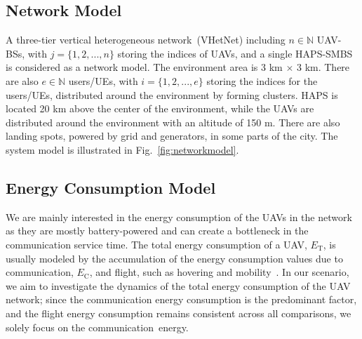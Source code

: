 \documentclass[conference, a4paper]{IEEEtran}
\begin{document}
\subsection{Network Model}
A three-tier vertical heterogeneous network~(VHetNet) including $n \in \mathbb{N}$ UAV-BSs, with $j=\{1, 2, ..., n\}$ storing the indices of UAVs, and a single HAPS-SMBS is considered as a network model. 
The environment area is 3 km $\times$ 3 km.
There are also $e \in \mathbb{N}$ users/UEs, with $i=\{1, 2, ..., e\}$ storing the indices for the users/UEs, distributed around the environment by forming clusters.
HAPS is located 20 km above the center of the environment, while the UAVs are distributed around the environment with an altitude of 150 m.
There are also landing spots, powered by grid and generators, in some parts of the city.
The system model is illustrated in Fig.~\ref{fig:networkmodel}.

\subsection{Energy Consumption Model}
We are mainly interested in the energy consumption of the UAVs in the network as they are mostly battery-powered and can create a bottleneck in the communication service time.
The total energy consumption of a UAV, $E_\text{T}$, is usually modeled by the accumulation of the energy consumption values due to communication, $E_\text{C}$, and flight, such as hovering and mobility~\cite{UAV_energy}.
In our scenario, we aim to investigate the dynamics of the total energy consumption of the UAV network; since the communication energy consumption is the predominant factor, and the flight energy consumption remains consistent across all comparisons, we solely focus on the communication~energy.
\end{document}
